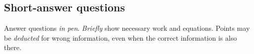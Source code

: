 \renewcommand{\myhead}{\small \bf Bio 1M03\hfill{}\textbf{Student \#} \hrulefill\ \hfill\ Version \testver}

\subsection*{Short-answer questions}

{Answer questions \emph{in pen}.  \emph{Briefly} show necessary work and equations. Points may be \emph{deducted} for wrong information, even when the correct information is also there.}

